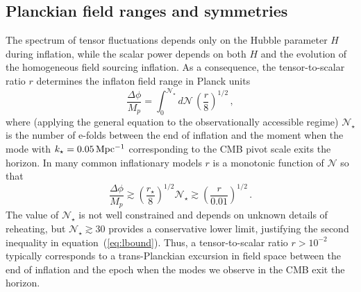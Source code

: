 %
\subsection{Planckian field ranges and symmetries}
The spectrum of tensor fluctuations depends only on the Hubble parameter $H$ during inflation, while the scalar power depends on both $H$ and the evolution of the homogeneous field sourcing inflation. As a consequence, the tensor-to-scalar ratio $r$ determines the inflaton field range in Planck units~\cite{Lyth:1996im}
\begin{equation}
\label{eq:Lyth}
\frac{\Delta\phi}{M_p}=\int_0^{\mathcal{N}_\star}d\mathcal{N}\,\left(\frac{r}{8}\right)^{1/2}\,,
\end{equation}
where (applying the general equation to the observationally accessible regime) $\mathcal{N}_\star$ is the number of e-folds between the end of inflation and the moment when the mode with $k_\star=0.05\,{\rm Mpc^{-1}}$ corresponding to the CMB pivot scale exits the horizon. In many common inflationary models $r$ is a monotonic function of $\mathcal{N}$ so that
\begin{equation}
\label{eq:lbound}
\frac{\Delta\phi}{M_p}\gtrsim \left(\frac{r_\star}{8}\right)^{1/2}\mathcal{N}_\star\gtrsim \left(\frac{r}{0.01}\right)^{1/2}\,.
\end{equation}  
The value of $\mathcal{N}_\star$ is not well constrained and depends on unknown details of reheating, but $\mathcal{N}_\star\gtrsim 30$ provides a conservative lower limit, justifying the second inequality in equation~(\ref{eq:lbound}). Thus, a tensor-to-scalar ratio $r>10^{-2}$ typically corresponds to a trans-Planckian excursion in field space between the end of inflation and the epoch when the modes we observe in the CMB exit the horizon.

